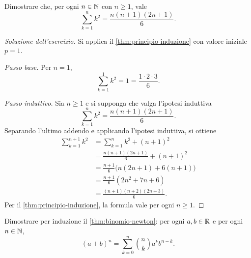 \begin{exercise}
\label{ex:tutorato01-somma-quadrati}
Dimostrare che, per ogni \(n\in\mathbb{N}\) con \(n\ge1\), vale
\[
  \sum_{k=1}^{n}k^2=\frac{n(n+1)(2n+1)}6.
\]
\end{exercise}

\begin{proof}[Soluzione dell'esercizio]
Si applica il \cref{thm:principio-induzione} con valore
iniziale \(p=1\).

\emph{Passo base.}
Per \(n=1\),
\[
  \sum_{k=1}^{1}k^2=1=\frac{1\cdot2\cdot3}{6}.
\]

\emph{Passo induttivo.}
Sia \(n\ge1\) e si supponga che valga l'ipotesi induttiva
\[
  \sum_{k=1}^{n}k^2=\frac{n(n+1)(2n+1)}6.
\]
Separando l'ultimo addendo e applicando l'ipotesi induttiva,
si ottiene
\begin{align*}
  \sum_{k=1}^{n+1}k^2
    &=\sum_{k=1}^{n}k^2+(n+1)^2\\
    &=\frac{n(n+1)(2n+1)}6+(n+1)^2\\
    &=\frac{n+1}{6}\bigl(n(2n+1)+6(n+1)\bigr)\\
    &=\frac{n+1}{6}(2n^2+7n+6)\\
    &=\frac{(n+1)(n+2)(2n+3)}6.
\end{align*}
Per il \cref{thm:principio-induzione}, la formula vale per
ogni \(n\ge1\).
\end{proof}

\begin{exercise}
\label{ex:tutorato01-binomio-newton}
Dimostrare per induzione il \cref{thm:binomio-newton}: per ogni
\(a,b\in\mathbb{R}\) e per ogni \(n\in\mathbb{N}\),
\[
  (a+b)^n=\sum_{k=0}^{n}\binom{n}{k}a^k b^{n-k}.
\]
\end{exercise}

